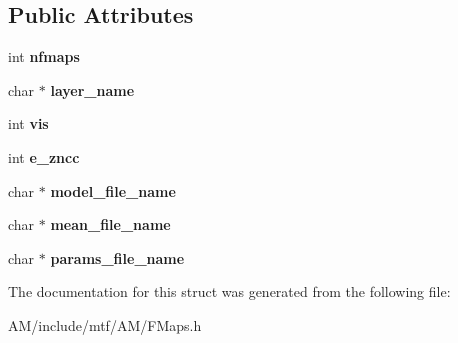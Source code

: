 \subsection*{Public Attributes}
\begin{DoxyCompactItemize}
\item 
\hypertarget{structFMapsParams_a605b83b6860dd8decc72d8aed3c07650}{int {\bfseries nfmaps}}\label{structFMapsParams_a605b83b6860dd8decc72d8aed3c07650}

\item 
\hypertarget{structFMapsParams_abc7892296a5aaee60c7ff7bbea76ad4c}{char $\ast$ {\bfseries layer\-\_\-name}}\label{structFMapsParams_abc7892296a5aaee60c7ff7bbea76ad4c}

\item 
\hypertarget{structFMapsParams_abd2e905d6f4f8287d9c8b6dae91b7e58}{int {\bfseries vis}}\label{structFMapsParams_abd2e905d6f4f8287d9c8b6dae91b7e58}

\item 
\hypertarget{structFMapsParams_a716dda3953dac62610821998196f7e92}{int {\bfseries e\-\_\-zncc}}\label{structFMapsParams_a716dda3953dac62610821998196f7e92}

\item 
\hypertarget{structFMapsParams_a335882b284535adf536cef6cc990c859}{char $\ast$ {\bfseries model\-\_\-file\-\_\-name}}\label{structFMapsParams_a335882b284535adf536cef6cc990c859}

\item 
\hypertarget{structFMapsParams_a03825ed5283c2bec2078e97cafecdeb9}{char $\ast$ {\bfseries mean\-\_\-file\-\_\-name}}\label{structFMapsParams_a03825ed5283c2bec2078e97cafecdeb9}

\item 
\hypertarget{structFMapsParams_a31fa30b5fd632b648d292bfd829de57d}{char $\ast$ {\bfseries params\-\_\-file\-\_\-name}}\label{structFMapsParams_a31fa30b5fd632b648d292bfd829de57d}

\end{DoxyCompactItemize}


The documentation for this struct was generated from the following file\-:\begin{DoxyCompactItemize}
\item 
A\-M/include/mtf/\-A\-M/F\-Maps.\-h\end{DoxyCompactItemize}
